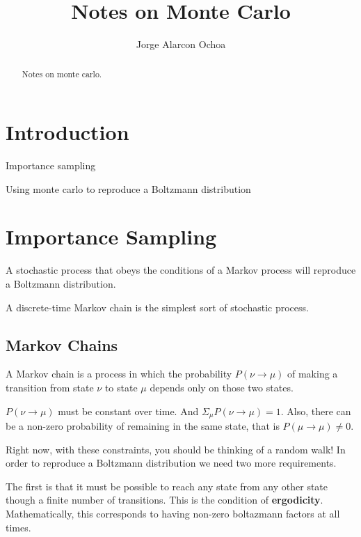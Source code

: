 \documentclass{article}
\title{Notes on Monte Carlo}
\author{
  Jorge Alarcon Ochoa
}
\begin{document}
\maketitle

\begin{abstract}
Notes on monte carlo.
\end{abstract}




\section{Introduction}
\begin{description}
\item Importance sampling
\item Using monte carlo to reproduce a Boltzmann distribution
\end{description}


\section{Importance Sampling}

A stochastic process that obeys the conditions of a Markov process will reproduce a Boltzmann distribution.

A discrete-time Markov chain is the simplest sort of stochastic process.

\subsection{Markov Chains}

A Markov chain is a process in which the probability
$P(\nu \rightarrow \mu)$
of making a transition from state $\nu$ to state $\mu$ depends only on those two states.

$P(\nu\rightarrow\mu)$ must be constant over time.
And $\Sigma_{\mu} P(\nu\rightarrow\mu) = 1$.
Also, there can be a non-zero probability of remaining in the same state, that is $P(\mu\rightarrow\mu) \neq 0$.

Right now, with these constraints, you should be thinking of a random walk!
In order to reproduce a Boltzmann distribution we need two more requirements.

The first is that it must be possible to reach any state from any other state though a finite number of transitions.
This is the condition of \textbf{ergodicity}.
Mathematically, this corresponds to having non-zero boltazmann factors at all times.
\end{document}
